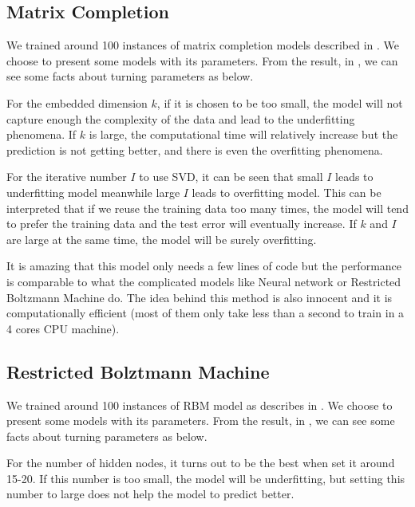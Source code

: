 \documentclass[bj, preprint]{imsart}
\begin{document}
\subsection{Matrix Completion}\label{sebsec:results.svd}
We trained around 100 instances of matrix completion models described in . We choose to present some models with its parameters. From the result, in , we can see some facts about turning parameters as below.

For the embedded dimension $k$, if it is chosen to be too small, the model will not capture enough the complexity of the data and lead to the underfitting phenomena. If $k$ is large, the computational time will relatively increase but the prediction is not getting better, and there is even the overfitting phenomena. 

For the iterative number $I$ to use SVD, it can be seen that small $I$ leads to underfitting model meanwhile large $I$ leads to overfitting model. This can be interpreted that if we reuse the training data too many times, the model will tend to prefer the training data and the test error will eventually increase. If $k$ and $I$ are large at the same time, the model will be surely overfitting.

It is amazing that this model only needs a few lines of code but the performance is comparable to what the complicated models like Neural network or Restricted Boltzmann Machine do. The idea behind this method is also innocent and it is computationally efficient (most of them only take less than a second to train in a 4 cores CPU machine).     

\subsection{Restricted Bolztmann Machine}\label{sebsec:results.rbm}

We trained around 100 instances of RBM model as describes in . We choose to present some models with its parameters. From the result, in , we can see some facts about turning parameters as below.

For the number of hidden nodes, it turns out to be the best when set it around 15-20. If this number is too small, the model will be underfitting, but setting this number to large does not help the model to predict better.
\end{document}
